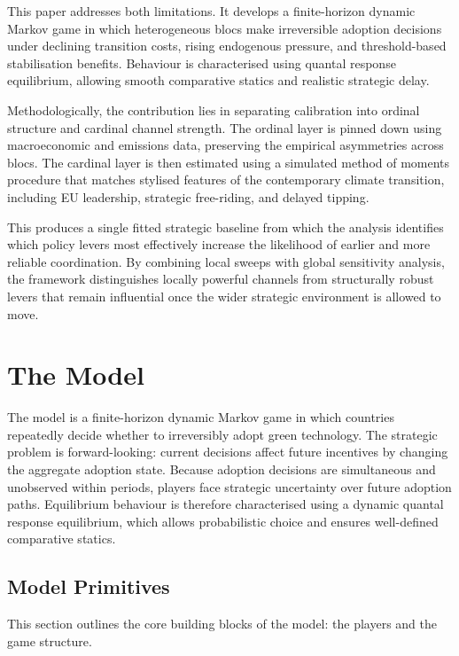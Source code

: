 \documentclass[12pt,a4paper]{article}
\begin{document}
This paper addresses both limitations. It develops a finite-horizon dynamic Markov game in which heterogeneous blocs make irreversible adoption decisions under declining transition costs, rising endogenous pressure, and threshold-based stabilisation benefits. Behaviour is characterised using quantal response equilibrium, allowing smooth comparative statics and realistic strategic delay.

Methodologically, the contribution lies in separating calibration into ordinal structure and cardinal channel strength. The ordinal layer is pinned down using macroeconomic and emissions data, preserving the empirical asymmetries across blocs. The cardinal layer is then estimated using a simulated method of moments procedure that matches stylised features of the contemporary climate transition, including EU leadership, strategic free-riding, and delayed tipping.

This produces a single fitted strategic baseline from which the analysis identifies which policy levers most effectively increase the likelihood of earlier and more reliable coordination. By combining local sweeps with global sensitivity analysis, the framework distinguishes locally powerful channels from structurally robust levers that remain influential once the wider strategic environment is allowed to move.

\section{The Model}

The model is a finite-horizon dynamic Markov game in which countries repeatedly decide whether to irreversibly adopt green technology. The strategic problem is forward-looking: current decisions affect future incentives by changing the aggregate adoption state. Because adoption decisions are simultaneous and unobserved within periods, players face strategic uncertainty over future adoption paths. Equilibrium behaviour is therefore characterised using a dynamic quantal response equilibrium, which allows probabilistic choice and ensures well-defined comparative statics.

\subsection{Model Primitives}

This section outlines the core building blocks of the model: the players and the game structure.
\end{document}
